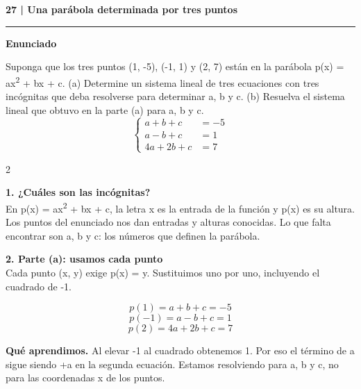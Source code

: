 \documentclass[11pt,a4paper,landscape]{article}
\newcommand{\titulo}[1]{{\LARGE\bfseries #1}\par\smallskip\hrule\medskip}
\begin{document}
\newpage{}\hypertarget{1.1-27}{}
\titulo{27 | Una parábola determinada por tres puntos}
\textbf{Enunciado}\par Suponga que los tres puntos (1, -5), (-1, 1) y (2, 7) están en la parábola p(x) = ax\textsuperscript{2} + bx + c. (a) Determine un sistema lineal de tres ecuaciones con tres incógnitas que deba resolverse para determinar a, b y c. (b) Resuelva el sistema lineal que obtuvo en la parte (a) para a, b y c.
\[\left\{\begin{aligned}a + b + c &= -5\\a - b + c &= 1\\4a + 2b + c &= 7\end{aligned}\right.\]
\begin{multicols*}{2}
\noindent\begin{minipage}{\linewidth}\textbf{1. ¿Cuáles son las incógnitas?}\\[2pt]En p(x) = ax\textsuperscript{2} + bx + c, la letra x es la entrada de la función y p(x) es su altura. Los puntos del enunciado nos dan entradas y alturas conocidas. Lo que falta encontrar son a, b y c: los números que definen la parábola.
\end{minipage}\par\medskip
\noindent\begin{minipage}{\linewidth}\textbf{2. Parte (a): usamos cada punto}\\[2pt]Cada punto (x, y) exige p(x) = y. Sustituimos uno por uno, incluyendo el cuadrado de -1.
\par{}\par\smallskip
\[p(1)=a+b+c=-5\]
\[p(-1)=a-b+c=1\]
\[p(2)=4a+2b+c=7\]
\par\smallskip\textbf{Qué aprendimos.} Al elevar -1 al cuadrado obtenemos 1. Por eso el término de a sigue siendo +a en la segunda ecuación. Estamos resolviendo para a, b y c, no para las coordenadas x de los puntos.

\end{minipage}
\end{multicols*}
\end{document}
